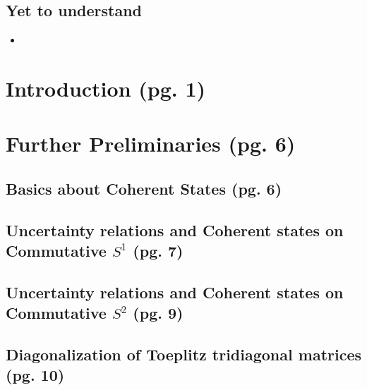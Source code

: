 \documentclass{article}
\begin{document}
\subsection{Yet to understand}

    \begin{itemize}

    \item 
    
    \end{itemize}

\section{Introduction (pg. 1)}

\section{Further Preliminaries (pg. 6)}

\subsection{Basics about Coherent States (pg. 6)}

\subsection{Uncertainty relations and Coherent states on Commutative $S^1$ (pg. 7)}

\subsection{Uncertainty relations and Coherent states on Commutative $S^2$ (pg. 9)}

\subsection{Diagonalization of Toeplitz tridiagonal matrices (pg. 10)}
\end{document}
